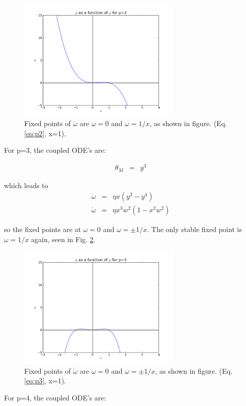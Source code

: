 \begin{figure}[h]
\centering
\includegraphics[width=0.7\textwidth]{./p2.png}
\caption{Fixed points of $\dot \omega$ are $\omega = 0$ and $\omega = 1/x$, as shown in figure. (Eq. \ref{eq:p2}, x=1).}
\label{fig:p2}
\end{figure}

For p=3, the coupled ODE's are: 

\begin{eqnarray}
\theta_M &=& y^3
\end{eqnarray}

which leads to
\begin{eqnarray}
\dot \omega &=& \eta x (y^2-y^4) \\
\dot \omega &=&  \eta x^3w^2(1-x^2w^2) \label{eq:p3}
\end{eqnarray}

so the fixed points are at $\omega = 0$ and $\omega = \pm 1/x$. The only stable fixed point is $\omega = 1/x$ again, seen in Fig. \ref{fig:p3}.

\begin{figure}[h]
\centering
\includegraphics[width=0.7\textwidth]{./p3.png}
\caption{Fixed points of $\dot \omega$ are $\omega = 0$ and $\omega = \pm 1/x$, as shown in figure. (Eq. \ref{eq:p3}, x=1).}
\label{fig:p3}
\end{figure}
\newpage
For p=4, the coupled ODE's are: 

